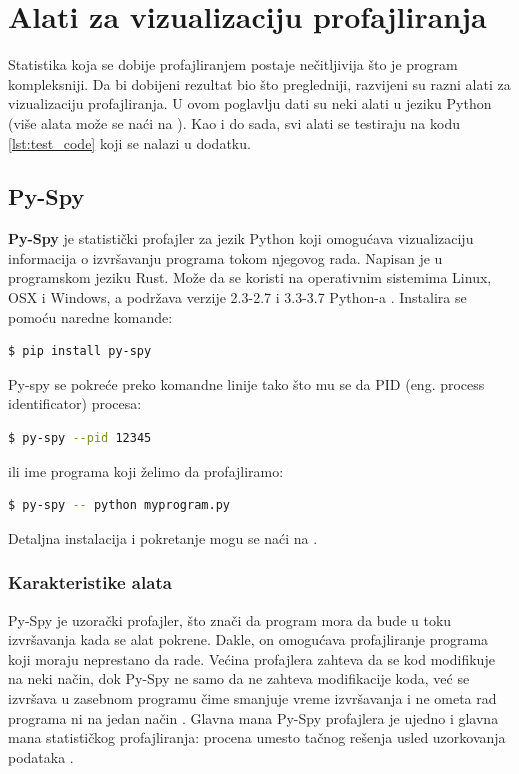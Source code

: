 \documentclass[a4paper]{article}
\begin{document}
\section{Alati za vizualizaciju profajliranja}
Statistika koja se dobije profajliranjem postaje nečitljivija što je program kompleksniji. Da bi dobijeni rezultat bio što pregledniji, razvijeni su razni alati za vizualizaciju profajliranja. U ovom poglavlju dati su neki alati u jeziku Python (više alata može se naći na \cite{VizList}). Kao i do sada, svi alati se testiraju na kodu \ref{lst:test_code} koji se nalazi u dodatku.
    
\subsection{Py-Spy}
\label{profajler_3}
\textbf{Py-Spy} je statistički profajler za jezik Python koji omogućava vizualizaciju informacija o izvršavanju programa tokom njegovog rada. Napisan je u programskom jeziku Rust. Može da se koristi na operativnim sistemima Linux, OSX i Windows, a podržava verzije 2.3-2.7 i 3.3-3.7 Python-a \cite{PySpy1}. Instalira se pomoću naredne komande:
\begin{lstlisting}[language=bash, belowskip=-\baselineskip]
  $ pip install py-spy
\end{lstlisting}
Py-spy se pokreće preko komandne linije tako što mu se da PID (eng. process identificator) procesa:
\begin{lstlisting}[language=bash, belowskip=-\baselineskip]
  $ py-spy --pid 12345
\end{lstlisting}
ili ime programa koji želimo da profajliramo:
\begin{lstlisting}[language=bash, belowskip=-\baselineskip]
  $ py-spy -- python myprogram.py
\end{lstlisting}
Detaljna instalacija i pokretanje mogu se naći na \cite{PySpy1}.
\subsubsection{Karakteristike alata}
Py-Spy je uzorački profajler, što znači da program mora da bude u toku izvršavanja kada se alat pokrene. Dakle, on omogućava profajliranje programa koji moraju neprestano da rade. Većina profajlera zahteva da se kod modifikuje na neki način, dok Py-Spy ne samo da ne zahteva modifikacije koda, već se izvršava u zasebnom programu čime smanjuje vreme izvršavanja i ne ometa rad programa ni na jedan način \cite{PySpy2}. Glavna mana Py-Spy profajlera je ujedno i glavna mana statističkog profajliranja: procena umesto tačnog rešenja usled uzorkovanja podataka \cite{StatProf2}. 
\end{document}
